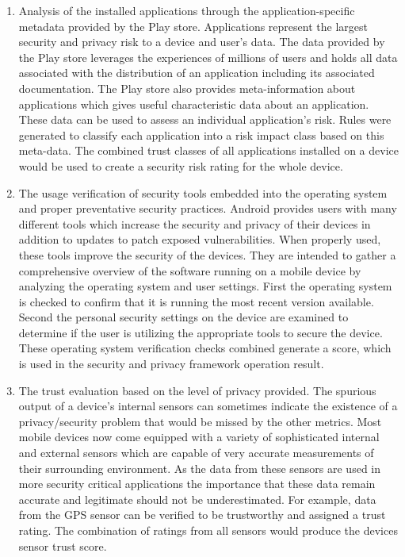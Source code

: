 \begin{enumerate}
\item Analysis of the installed applications through the application-specific metadata provided by the Play store. Applications represent the largest security and privacy risk to a device and user's data. The data provided by the Play store leverages the experiences of millions of users and holds all data associated with the distribution of an application including its associated documentation. The Play store also provides meta-information about applications which gives useful characteristic data about an application. These data can be used to assess an individual application's risk. Rules were generated to classify each application into a risk impact class based on this meta-data. The combined trust classes of all applications installed on a device would be used to create a security risk rating for the whole device.

\item The usage verification of security tools embedded into the operating system and proper preventative security practices. Android provides users with many different tools which increase the security and privacy of their devices in addition to updates 
to patch exposed vulnerabilities.  When properly used, these tools improve the security of the devices. They are 
intended to gather a 
comprehensive overview of the software running on a mobile device by analyzing the operating system and user settings. 
First the operating system is checked to confirm that it is running the most recent version available. Second the personal 
security settings on the device are examined to determine if the user is utilizing the appropriate tools to secure the device. 
These operating system verification checks combined generate a score, which is used in the security and privacy framework operation result.

\item The trust evaluation based on the level of privacy provided.  
The spurious output of a device's internal sensors can sometimes indicate the existence of a privacy/security problem 
that would be missed by the other metrics. Most mobile devices now come equipped with a variety of sophisticated 
internal and external sensors which are capable of very accurate measurements of their surrounding environment. 
As the data from these sensors are used in more security critical applications the importance that these data remain accurate and legitimate should not be underestimated. For example, data from the GPS sensor can be verified to be trustworthy and assigned a trust rating. The combination of ratings from all sensors would produce the devices sensor trust score.
\end{enumerate}


